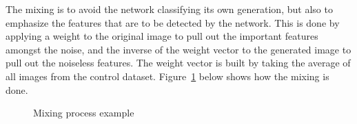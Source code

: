 \documentclass{report}
\begin{document}
The mixing is to avoid the network classifying its own generation, but also to emphasize the features that are to be detected by the network. This is done by applying a weight to the original image to pull out the important features amongst the noise, and the inverse of the weight vector to the generated image to pull out the noiseless features. The weight vector is built by taking the average of all images from the control dataset. Figure~\ref{fig:mixing} below shows how the mixing is done.

\begin{figure}
	\centering
	\caption{Mixing process example}
	\label{fig:mixing}
\end{figure}


\pagebreak







\end{document}
